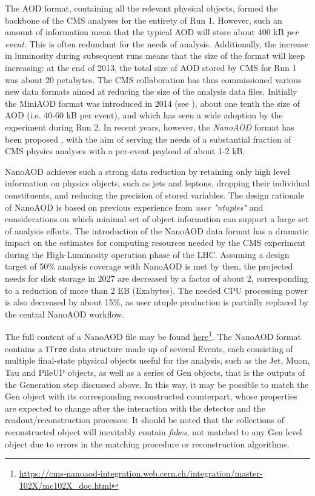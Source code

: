 The AOD format, containing all the relevant physical objects, formed the backbone of the CMS analyses for the entirety of Run 1. However, such an amount of information mean that the typical AOD will store about 400 kB \emph{per event}. This is often redundant for the needs of analysis. Additionally, the increase in luminosity during subsequent runs means that the size of the format will keep increasing: at the end of 2013, the total size of AOD stored by CMS for Run 1 was about 20 petabytes. The CMS collaboration has thus commissioned various new data formats aimed at reducing the size of the analysis data files.
Initially the MiniAOD format was introduced in 2014 (see \cite{Petrucciani_2015}), about one tenth the size of AOD (i.e. 40-60 kB per event), and which has seen a wide adoption by the experiment during Run 2. In recent years, however, the \emph{NanoAOD} format has been proposed \cite{Peruzzi_2020}, with the aim of serving the needs of a substantial fraction of CMS physics analyses with a per-event payload of about 1-2 kB.

NanoAOD achieves such a strong data reduction by retaining only high level information on physics objects, such as jets and leptons, dropping their individual constituents, and reducing the precision of stored variables.
The design rationale of NanoAOD is based on previous experience from \emph{user "ntuples"} and considerations on which minimal set of object information can support a large set of analysis efforts. The introduction of the NanoAOD data format has a dramatic impact on the estimates for computing resources needed by the CMS experiment during the High-Luminosity operation phase of the LHC. Assuming a design target of 50$\%$ analysis coverage with NanoAOD is met by then, the projected needs for disk storage in 2027 are decreased by a factor of about 2, corresponding to a reduction of more than 2 EB (Exabytes). The needed CPU processing power is also decreased by about 15$\%$, as user ntuple production is partially replaced by the central NanoAOD workflow. 

The full content of a NanoAOD file may be found \href{https://cms-nanoaod-integration.web.cern.ch/integration/master-102X/mc102X_doc.html}{here}\footnote{\url{https://cms-nanoaod-integration.web.cern.ch/integration/master-102X/mc102X_doc.html}}. The NanoAOD format contains a \texttt{TTree} data structure made up of several Events, each consisting of multiple final-state physical objects useful for the analysis, such as the Jet, Muon, Tau and PileUP objects, as well as a series of Gen objects, that is the outputs of the Generation step discussed above. In this way, it may be possible to match the Gen object with its corresponding reconstructed counterpart, whose properties are expected to change after the interaction with the detector and the readout/reconstruction processes. It should be noted that the collections of reconstructed object will inevitably contain \emph{fakes}, not matched to any Gen level object due to errors in the matching procedure or reconstruction algorithms.

